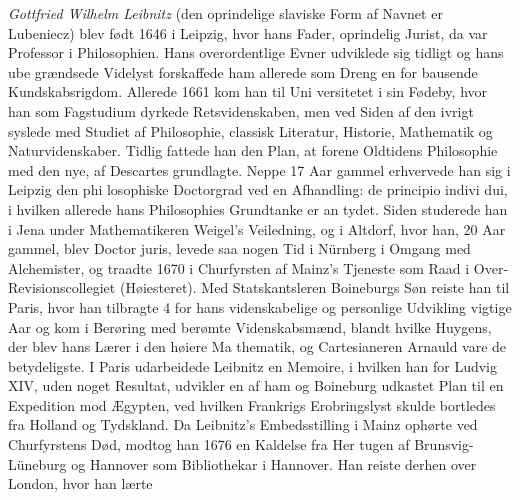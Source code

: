 \documentclass[12pt,a4paper]{book}
\begin{document}
\emph{Gottfried Wilhelm Leibnitz} (den oprindelige slaviske
Form af Navnet er Lubeniecz) blev født 1646 i Leipzig, hvor
hans Fader, oprindelig Jurist, da var Professor i Philosophien.
Hans overordentlige Evner udviklede sig tidligt og hans ube\-%
grændsede Videlyst forskaffede ham allerede som Dreng en for\-%
bausende Kundskabsrigdom. Allerede 1661 kom han til Uni\-%
versitetet i sin Fødeby, hvor han som Fagstudium dyrkede
Retsvidenskaben, men ved Siden af den ivrigt syslede med
Studiet af Philosophie, classisk Literatur, Historie, Mathematik
og Naturvidenskaber. Tidlig fattede han den Plan, at forene
Oldtidens Philosophie med den nye, af Descartes grundlagte.
Neppe 17 Aar gammel erhvervede han sig i Leipzig den phi\-%
losophiske Doctorgrad ved en Afhandling: de principio indivi\-%
dui, i hvilken allerede hans Philosophies Grundtanke er an\-%
tydet. Siden studerede han i Jena under Mathematikeren
Weigel's Veiledning, og i Altdorf, hvor han, 20 Aar gammel,
blev Doctor juris, levede saa nogen Tid i Nürnberg i Omgang
med Alchemister, og traadte 1670 i Churfyrsten af Mainz's
Tjeneste som Raad i Over-Revisionscollegiet (Høiesteret). Med
Statskantsleren Boineburgs Søn reiste han til Paris, hvor han
tilbragte 4 for hans videnskabelige og personlige Udvikling
vigtige Aar og kom i Berøring med berømte Videnskabsmænd,
blandt hvilke Huygens, der blev hans Lærer i den høiere Ma\-%
thematik, og Cartesianeren Arnauld vare de betydeligste.
I Paris udarbeidede Leibnitz en Memoire, i hvilken han for
Ludvig XIV, uden noget Resultat, udvikler en af ham og
Boineburg udkastet Plan til en Expedition mod Ægypten, ved
hvilken Frankrigs Erobringslyst skulde bortledes fra Holland
og Tydskland. Da Leibnitz's Embedsstilling i Mainz ophørte
ved Churfyrstens Død, modtog han 1676 en Kaldelse fra Her\-%
tugen af Brunsvig-Lüneburg og Hannover som Bibliothekar i
Hannover. Han reiste derhen over London, hvor han lærte
\end{document}
